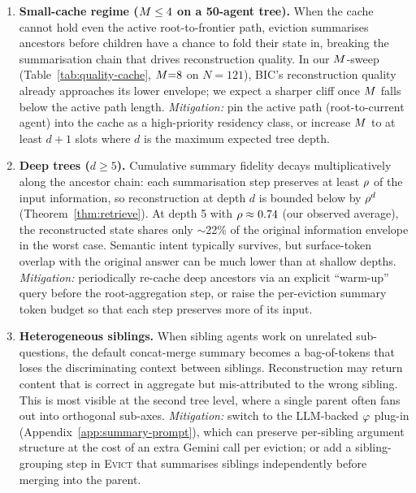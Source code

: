 \begin{enumerate}
\item \textbf{Small-cache regime ($M \leq 4$ on a 50-agent
  tree).}  When the cache cannot hold even the active root-to-frontier
  path, eviction summarises ancestors before children have a chance to
  fold their state in, breaking the summarisation chain that drives
  reconstruction quality.  In our $M$-sweep
  (Table~\ref{tab:quality-cache}, $M{=}8$ on $N{=}121$), BIC's
  reconstruction quality already approaches its lower envelope; we
  expect a sharper cliff once $M$ falls below the active path
  length.  \emph{Mitigation:} pin the active path (root-to-current
  agent) into the cache as a high-priority residency class, or
  increase $M$ to at least $d+1$ slots where $d$ is the maximum
  expected tree depth.

\item \textbf{Deep trees ($d \geq 5$).}  Cumulative summary fidelity
  decays multiplicatively along the ancestor chain: each
  summarisation step preserves at least $\rho$ of the input
  information, so reconstruction at depth $d$ is bounded below by
  $\rho^d$ (Theorem~\ref{thm:retrieve}).  At depth 5 with
  $\rho \approx 0.74$ (our observed average), the reconstructed
  state shares only $\sim$22\% of the original information envelope
  in the worst case.  Semantic intent typically survives, but
  surface-token overlap with the original answer can be much lower
  than at shallow depths.  \emph{Mitigation:} periodically re-cache
  deep ancestors via an explicit ``warm-up'' query before the
  root-aggregation step, or raise the per-eviction summary token
  budget so that each step preserves more of its input.

\item \textbf{Heterogeneous siblings.}  When sibling agents work on
  unrelated sub-questions, the default concat-merge summary becomes
  a bag-of-tokens that loses the discriminating context between
  siblings.  Reconstruction may return content that is correct in
  aggregate but mis-attributed to the wrong sibling.  This is most
  visible at the second tree level, where a single parent often
  fans out into orthogonal sub-axes.  \emph{Mitigation:} switch to
  the LLM-backed $\varphi$ plug-in
  (Appendix~\ref{app:summary-prompt}), which can preserve
  per-sibling argument structure at the cost of an extra Gemini call
  per eviction; or add a sibling-grouping step in
  \textsc{Evict} that summarises siblings independently before
  merging into the parent.


\end{enumerate}
